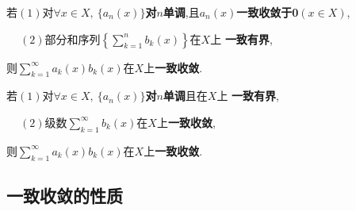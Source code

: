 \documentclass[UTF8]{ctexart}
\begin{document}
\begin{multicols}{2}
    \begin{tcolorbox}[colframe=blue,title={\subsubsection{{\color{red}{{\zihao{-5}[函数项级数的积]}}}狄利克雷判别法}}]
        若$(1)$对$\forall x\in X,\ \{a_n(x)\}$\textbf{对$n$单调},且$a_n(x)$\textbf{一致收敛于0}$(x\in X)$,
        
        $\quad\ (2)$部分和序列$\left\{\sum_{k=1}^nb_k(x)\right\}$在$X$上
        \textbf{一致有界},
        
        则$\sum_{k=1}^\infty a_k(x)b_k(x)$在$X$上\textbf{一致收敛}.
    \end{tcolorbox}
        
    \begin{tcolorbox}[colframe=blue,title={\subsubsection{{\color{red}{{\zihao{-5}[函数项级数的积]}}}阿贝尔判别法}}]
        若$(1)$对$\forall x\in X,\ \{a_n(x)\}$\textbf{对$n$单调}且在$X$上 \textbf{一致有界},
        
        $\quad\ (2)$级数$\sum_{k=1}^\infty b_k(x)$在$X$上\textbf{一致收敛},
        
        则$\sum_{k=1}^\infty a_k(x)b_k(x)$在$X$上\textbf{一致收敛}.
    \end{tcolorbox}
\end{multicols}

\subsection{一致收敛的性质}
\end{document}
